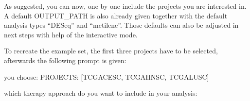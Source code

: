 \documentclass[letterpaper,10pt,english]{sphinxmanual}
\begin{document}
\sphinxAtStartPar
As suggested, you can now, one by one include the projects you are interested in.
A default OUTPUT\_PATH is also already given together with the default analysis
types “DESeq” and “metilene”. Those defaults can also be adjusted in next steps
with help of the interactive mode.

\sphinxAtStartPar
To recreate the example set, the first three projects have to be selected,
afterwards the following prompt is given:

\begin{sphinxVerbatim}[commandchars=\\\{\}]
you choose:
PROJECTS:        [\PYGZsq{}TCGA\PYGZhy{}CESC\PYGZsq{}, \PYGZsq{}TCGA\PYGZhy{}HNSC\PYGZsq{}, \PYGZsq{}TCGA\PYGZhy{}LUSC\PYGZsq{}]

which therapy approach do you want to include in your analysis:


\end{sphinxVerbatim}
\end{document}
